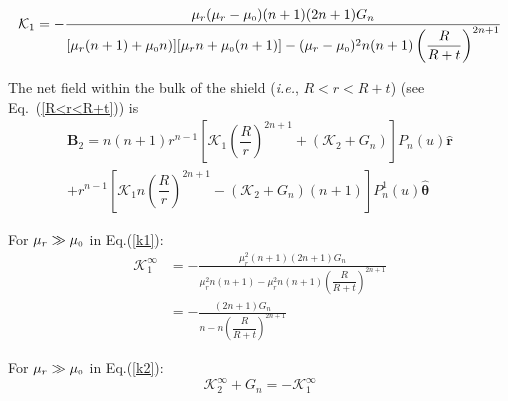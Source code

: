 

\begin{equation}\label{k1}
\mathcal{K}_1=-\frac{\mu_r(\mu_r-\mu_{\scriptscriptstyle 0})(n+1) (2n+1)G_n}{[\mu_r(n+1)+\mu_{\scriptscriptstyle 0} n)][\mu_r n+\mu_{\scriptscriptstyle 0}(n+1)]-(\mu_r-\mu_{\scriptscriptstyle 0})^2 n(n+1)\left(\dfrac{R}{R+t}\right)^{2n+1}}
\end{equation}

The net field  within the bulk of the shield (\textit{i.e.}, $R<r<R+t$) (see Eq.~(\ref{R<r<R+t}))  is 
\begin{multline}\label{B2}
\bm B_2= n(n+1)r^{n-1}\left[\mathcal{K}_1 \left(\dfrac{R}{r}\right)^{2n+1}+(\mathcal{K}_2+G_n)\right] P_n(u) \bm{\hat{r}} \\+r^{n-1} \left[\mathcal{K}_1 n\left(\dfrac{R}{r}\right)^{2n+1}-(\mathcal{K}_2+G_n)(n+1) \right] P_n^1(u) \bm{\hat{\theta}}
\end{multline}

For \(\mu_r\gg\mu_{\scriptscriptstyle 0}\) in Eq.(\ref{k1}):
\begin{equation}\label{k12}
\begin{split}
\mathcal{K}_1^\infty & =-\frac{\mu_r^2(n+1) (2n+1)G_n}{\mu_r^2 n(n+1)-\mu_r^2 n(n+1)\left(\dfrac{R}{R+t}\right)^{2n+1}}\\
& =-\frac{(2n+1)G_n}{n-n\left(\dfrac{R}{R+t}\right)^{2n+1}}
\end{split}
\end{equation}

For \(\mu_r\gg\mu_{\scriptscriptstyle 0}\) in Eq.(\ref{k2}):
\begin{equation}\label{k22}
    \mathcal{K}_2^\infty+G_n=-\mathcal{K}_1^\infty
\end{equation}

